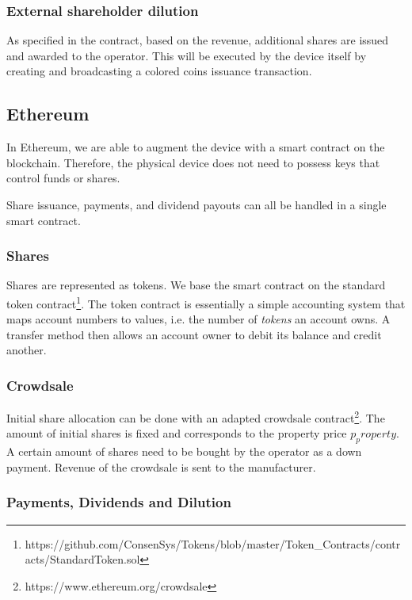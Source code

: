 \subsubsection{External shareholder dilution}
As specified in the contract, based on the revenue, additional shares are issued and awarded to the operator. This will be executed by the device itself by creating and broadcasting a colored coins issuance transaction.

\subsection{Ethereum}

In Ethereum, we are able to augment the device with a smart contract on the blockchain. Therefore, the physical device does not need to possess keys that control funds or shares. 

Share issuance, payments, and dividend payouts can all be handled in a single smart contract.

\subsubsection{Shares}

Shares are represented as tokens. We base the smart contract on the standard token contract\footnote{https://github.com/ConsenSys/Tokens/blob/master/Token\_Contracts/contracts/StandardToken.sol}. The token contract is essentially a simple accounting system that maps account numbers to values, i.e. the number of \emph{tokens} an account owns. A transfer method then allows an account owner to debit its balance and credit another.

\subsubsection{Crowdsale}

Initial share allocation can be done with an adapted crowdsale contract\footnote{https://www.ethereum.org/crowdsale}. The amount of initial shares is fixed and corresponds to the property price $p_property$. A certain amount of shares need to be bought by the operator as a down payment. Revenue of the crowdsale is sent to the manufacturer. 

\subsubsection{Payments, Dividends and Dilution}

